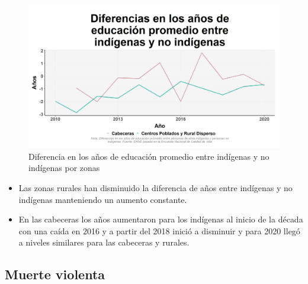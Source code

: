     \begin{figure}[H]
        \caption{Diferencia en los años de educación promedio entre indígenas y no indígenas por zonas \label{map_result_2} }
        \begin{center}
        \includegraphics[width=\textwidth,keepaspectratio]{img/var_124_trend.png}
        \end{center}
    \end{figure}
            \begin{itemize}
                \item Las zonas rurales han disminuido la diferencia de años entre indígenas y no indígenas manteniendo un aumento constante.
                \item En las cabeceras los años aumentaron para los indígenas al inicio de la década con una caída en 2016 y a partir del 2018 inició a disminuir y para 2020 llegó a niveles similares para las cabeceras y rurales.
                \end{itemize}

    \subsection{Muerte violenta}

